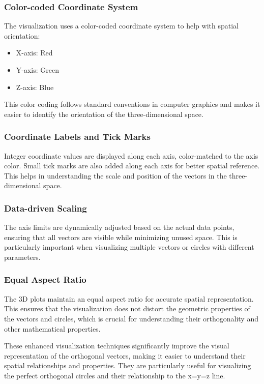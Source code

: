 \subsubsection{Color-coded Coordinate System}

The visualization uses a color-coded coordinate system to help with spatial orientation:

\begin{itemize}
    \item X-axis: Red
    \item Y-axis: Green
    \item Z-axis: Blue
\end{itemize}

This color coding follows standard conventions in computer graphics and makes it easier to identify the orientation of the three-dimensional space.

\subsubsection{Coordinate Labels and Tick Marks}

Integer coordinate values are displayed along each axis, color-matched to the axis color. Small tick marks are also added along each axis for better spatial reference. This helps in understanding the scale and position of the vectors in the three-dimensional space.

\subsubsection{Data-driven Scaling}

The axis limits are dynamically adjusted based on the actual data points, ensuring that all vectors are visible while minimizing unused space. This is particularly important when visualizing multiple vectors or circles with different parameters.

\subsubsection{Equal Aspect Ratio}

The 3D plots maintain an equal aspect ratio for accurate spatial representation. This ensures that the visualization does not distort the geometric properties of the vectors and circles, which is crucial for understanding their orthogonality and other mathematical properties.

These enhanced visualization techniques significantly improve the visual representation of the orthogonal vectors, making it easier to understand their spatial relationships and properties. They are particularly useful for visualizing the perfect orthogonal circles and their relationship to the x=y=z line.

